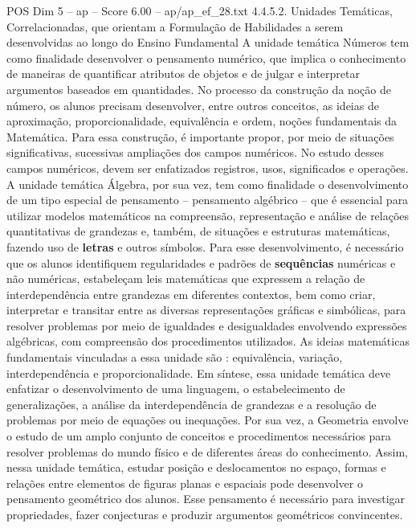 \begin{textsample}{POS Dim 5 – ap – Score 6.00 – ap/ap\_ef\_28.txt}  \label{ex:f5_pos_164}
4.4.5.2.
Unidades Temáticas, Correlacionadas, que orientam a Formulação de Habilidades a serem desenvolvidas ao longo do Ensino Fundamental A unidade temática Números tem como finalidade desenvolver o pensamento numérico, que implica o conhecimento de maneiras de quantificar atributos de objetos e de julgar e interpretar argumentos baseados em quantidades.
No processo da construção da noção de número, os alunos precisam desenvolver, entre outros conceitos, as ideias de aproximação, proporcionalidade, equivalência e ordem, noções fundamentais da Matemática.
Para essa construção, é importante propor, por meio de situações significativas, sucessivas ampliações dos campos numéricos.
No estudo desses campos numéricos, devem ser enfatizados registros, usos, significados e operações.
A unidade temática Álgebra, por sua vez, tem como finalidade o desenvolvimento de um tipo especial de pensamento – pensamento algébrico – que é essencial para utilizar modelos matemáticos na compreensão, representação e análise de relações quantitativas de grandezas e, também, de situações e estruturas matemáticas, fazendo uso de \textbf{letras} e outros símbolos.
Para esse desenvolvimento, é necessário que os alunos identifiquem regularidades e padrões de \textbf{sequências} numéricas e não numéricas, estabeleçam leis matemáticas que expressem a relação de interdependência entre grandezas em diferentes contextos, bem como criar, interpretar e transitar entre as diversas representações gráficas e simbólicas, para resolver problemas por meio de igualdades e desigualdades envolvendo expressões algébricas, com compreensão dos procedimentos utilizados.
As ideias matemáticas fundamentais vinculadas a essa unidade são : equivalência, variação, interdependência e proporcionalidade.
Em síntese, essa unidade temática deve enfatizar o desenvolvimento de uma linguagem, o estabelecimento de generalizações, a análise da interdependência de grandezas e a resolução de problemas por meio de equações ou inequações.
Por sua vez, a Geometria envolve o estudo de um amplo conjunto de conceitos e procedimentos necessários para resolver problemas do mundo físico e de diferentes áreas do conhecimento.
Assim, nessa unidade temática, estudar posição e deslocamentos no espaço, formas e relações entre elementos de figuras planas e espaciais pode desenvolver o pensamento geométrico dos alunos.
Esse pensamento é necessário para investigar propriedades, fazer conjecturas e produzir argumentos geométricos convincentes.

\end{textsample}
